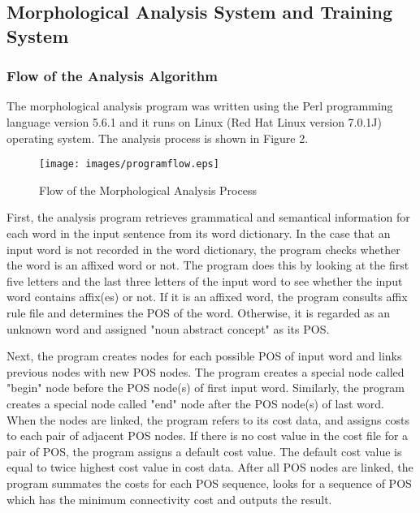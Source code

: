 \documentclass[english]{nlp}
\begin{document}
\subsection{Morphological Analysis System and Training System}
\subsubsection{Flow of the Analysis Algorithm}
The morphological analysis program was written using the Perl programming 
language version 5.6.1 and it runs on Linux (Red Hat Linux version 
7.0.1J) operating system. The analysis process is shown in Figure 2.

\begin{figure}[ht]
\begin{center}
\centerline{}
\texttt{[image: images/programflow.eps]}
\caption{Flow of the Morphological Analysis Process}
\label{fig:flowanalyze}
\end{center}
\end{figure}

First, the analysis program retrieves grammatical and semantical information
for each word in the input sentence from its word dictionary.
In the case that an input word is not recorded in the word 
dictionary, the program checks whether the word is an affixed word 
or not. The program does this by looking at the first five letters and
the last three letters of the input word to see whether the input word
contains affix(es) or not.
If it is an affixed word, the program consults affix rule 
file and determines the POS of the word. Otherwise, it is 
regarded as an unknown word and assigned "noun abstract concept" as 
its POS. 

Next, the program creates nodes for each possible POS of input word and
links previous nodes with new POS nodes.
The program creates a special node called "begin" node before the POS 
node(s) of first input word.
Similarly, the program creates a special node called "end" node after
the POS node(s) of last word.
When the nodes are linked, the program refers to its cost data, and assigns
costs to each pair of adjacent POS nodes.
If there is no cost value in the cost file for a pair of POS, the 
program assigns a default cost value.
The default cost value is equal to twice highest cost value in
cost data.
After all POS nodes are linked, the program summates the costs for each POS
sequence, looks for a sequence of POS which has the minimum
connectivity cost and outputs the result. 
\end{document}
